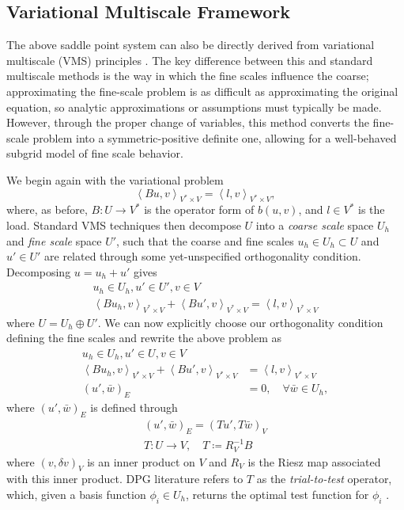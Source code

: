 \documentclass[final,leqno]{siamltex}
\newcommand{\LRp}[1]{\left( #1 \right)}
\newcommand{\LRa}[1]{\left\langle #1 \right\rangle}
\begin{document}
\subsection{Variational Multiscale Framework}

The above saddle point system can also be directly derived from variational multiscale (VMS) principles \cite{VMS1,VMS2}.  The key difference between this and standard multiscale methods is the way in which the fine scales influence the coarse; approximating the fine-scale problem is as difficult as approximating the original equation, so analytic approximations or assumptions must typically be made.  However, through the proper change of variables, this method converts the fine-scale problem into a symmetric-positive definite one, allowing for a well-behaved subgrid model of fine scale behavior.

We begin again with the variational problem
\[
\LRa{Bu,v}_{V^*\times V} = \LRa{l,v}_{V^*\times V},
\]
where, as before, $B: U\rightarrow V^*$ is the operator form of $b(u,v)$, and $l \in V^*$ is the load.  Standard VMS techniques then decompose $U$ into a \textit{coarse scale} space $U_h$ and \textit{fine scale} space $U'$, such that the coarse and fine scales $u_h \in U_h \subset U$ and $u' \in U'$ are related through some yet-unspecified orthogonality condition.  Decomposing $u = u_h + u'$ gives 
\begin{align*}
u_h \in U_h, u' \in U', v \in V\\
\LRa{Bu_h,v}_{V^*\times V} + \LRa{Bu',v}_{V^*\times V} = \LRa{l,v}_{V^*\times V}
\end{align*}
where $U = U_h\oplus U'$.  We can now explicitly choose our orthogonality condition defining the fine scales and rewrite the above problem as 
\begin{align*}
u_h \in U_h, u' \in U, v \in V\\
\LRa{Bu_h,v}_{V^*\times V} + \LRa{Bu',v}_{V^*\times V} &= \LRa{l,v}_{V^*\times V}\\
\LRp{u',\bar{w}}_E &= 0, \quad \forall \bar{w} \in U_h,
\end{align*}
where $\LRp{u',\bar{w}}_E$ is defined through
\begin{align*}
\LRp{u',\bar{w}}_E = \LRp{Tu',T\bar{w}}_V\\
T:U\rightarrow V, \quad T \coloneqq R_V^{-1} B
\end{align*}
where $\LRp{v,\delta v}_V$ is an inner product on $V$ and $R_V$ is the Riesz map associated with this inner product.  DPG literature refers to $T$ as the \textit{trial-to-test} operator, which, given a basis function $\phi_i \in U_h$, returns the optimal test function for $\phi_i$ \cite{DPG2}.  
\end{document}
